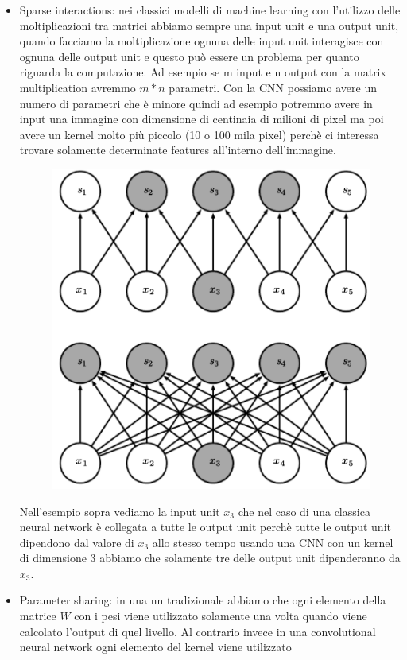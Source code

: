 \documentclass[14pt]{extreport}
\begin{document}
\begin{itemize}
	\item Sparse interactions: nei classici modelli di machine learning con l'utilizzo delle moltiplicazioni tra matrici abbiamo sempre una input unit
	      e una output unit, quando facciamo la moltiplicazione ognuna delle input unit interagisce con ognuna delle output unit e questo può essere
	      un problema per quanto riguarda la computazione. Ad esempio se m input e n output con la matrix multiplication avremmo $m*n$ parametri. Con
	      la CNN possiamo avere un numero di parametri che è minore quindi ad esempio potremmo avere in input una immagine con dimensione di centinaia
	      di milioni di pixel ma poi avere un kernel molto più piccolo (10 o 100 mila pixel) perchè ci interessa trovare solamente determinate
	      features all'interno dell'immagine.
	      \begin{figure}[H]
		      \centering
		      \includegraphics[width=0.7\linewidth]{411.jpeg}
	      \end{figure}
	      Nell'esempio sopra vediamo la input unit $x_3$ che nel caso di una classica neural network è collegata a tutte le output unit perchè tutte
	      le output unit dipendono dal valore di $x_3$ allo stesso tempo usando una CNN con un kernel di dimensione 3 abbiamo che solamente tre delle
	      output unit dipenderanno da $x_3$.
	\item Parameter sharing: in una nn tradizionale abbiamo che ogni elemento della matrice $W$ con i pesi viene utilizzato solamente una volta quando
	      viene calcolato l'output di quel livello. Al contrario invece in una convolutional neural network ogni elemento del kernel viene utilizzato

\end{itemize}
\end{document}

